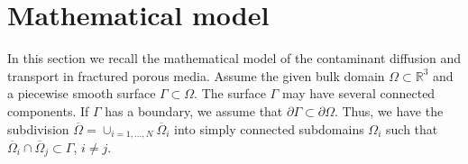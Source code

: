 \documentclass{article}
\def\dO{{\partial\Omega} }
\def\dG{{\partial\Gamma} }
\begin{document}
\section{Mathematical model}\label{s_setup}
In this section we recall the mathematical model of the contaminant  diffusion and transport in fractured  porous media. %
Assume the given bulk  domain $\Omega \subset \mathbb{R}^3$ and a piecewise smooth surface $\Gamma\subset\Omega$. The surface $\Gamma$ may have several connected components. If  $\Gamma$ has a boundary, we assume that $\dG\subset\dO$. %
Thus, we have the subdivision $\overline{\Omega}=\cup_{i=1,\dots,N}\overline{\Omega}_i$ into simply connected subdomains $\Omega_i$ such that $\overline{\Omega}_i\cap\overline{\Omega}_j\subset\Gamma$, $i\neq j$.
\end{document}
